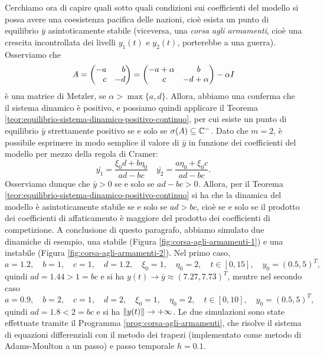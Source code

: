 Cerchiamo ora di capire quali sotto quali condizioni sui coefficienti
del modello si possa avere una coesistenza pacifica delle nazioni, cioè esista
un punto di equilibrio $\bar{y}$ asintoticamente stabile (viceversa, una
\emph{corsa agli armamenti}, cioè una crescita incontrollata dei livelli
$y_1(t)$ e $y_2(t)$, porterebbe a una guerra). Osserviamo che
\[
A = \begin{pmatrix*}[r]
-a & b \\
c & -d
\end{pmatrix*}
= \begin{pmatrix*}[c]
-a +\alpha & \hspace{0.7em} b \\
\hspace{0.65em} c & -d + \alpha
\end{pmatrix*}
- \alpha	 I
\]
è una matrice di Metzler, se $\alpha > \max\{a,d\}$. Allora, abbiamo una
conferma che il sistema dinamico è positivo, e possiamo quindi applicare
il Teorema \ref{teor:equilibrio-sistema-dinamico-positivo-continuo},
per cui esiste un punto di equilibrio $\bar{y}$ strettamente positivo
se e solo se $\sigma(A) \subseteq \mathbb{C}^-$.
Dato che $m = 2$, è possibile esprimere in modo semplice il valore di $\bar{y}$
in funzione dei coefficienti del modello per mezzo della regola di Cramer:
\[
\bar{y_1} = \frac{\xi_0 d + b \eta_0}{ad-bc}
\quad \bar{y_2} = \frac{a \eta_0 + \xi_0 c}{ad-bc}.
\]
Osserviamo dunque che $\bar{y} > 0$ se e solo se $ad-bc > 0$.
Allora, per il Teorema \ref{teor:equilibrio-sistema-dinamico-positivo-continuo}
si ha che la dinamica del modello è asintoticamente stabile se e solo se
$ad > bc$, cioè se e solo se il prodotto dei coefficienti di affaticamento
è maggiore del prodotto dei coefficienti di competizione.
A conclusione di questo paragrafo, abbiamo simulato due dinamiche di esempio,
una stabile (Figura \ref{fig:corsa-agli-armamenti-1}) e una instabile
(Figura \ref{fig:corsa-agli-armamenti-2}). Nel primo caso,
\[
a = 1.2, \quad b = 1, \quad c = 1, \quad d = 1.2,
\quad \xi_0 = 1, \quad \eta_0 = 2, \quad t \in [0,15], \quad y_0 = (0.5,5)^T,
\]
quindi $ad = 1.44 > 1 = bc$ e si ha $y(t) \to \bar{y} \approx (7.27,7.73)^T$,
mentre nel secondo caso
\[
a = 0.9, \quad b = 2, \quad c = 1, \quad d = 2,
\quad \xi_0 = 1, \quad \eta_0 = 2, \quad t \in [0,10], \quad y_0 = (0.5,5)^T,
\]
quindi $ad = 1.8 < 2 = bc$ e si ha $\left\lVert y(t)\right\rVert \to +\infty$.
Le due simulazioni sono state effettuate tramite il Programma \ref{prog:corsa-agli-armamenti},
che risolve il sistema di equazioni differenziali con il metodo dei trapezi
(implementato come metodo di Adams-Moulton a un passo) e passo temporale $h = 0.1$.

